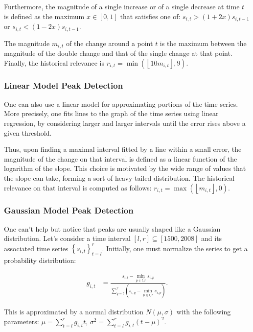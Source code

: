 Furthermore, the magnitude of a single increase or of a single decrease at time $t$ is defined as the maximum $x \in \left[ 0, 1 \right]$ that satisfies one of: $s_{i, t} > \left( 1 + 2x \right) s_{i, t - 1}$ or $s_{i, t} < \left( 1 - 2x \right) s_{i, t - 1}$.

The magnitude $m_{i, t}$ of the change around a point $t$ is the maximum between the magnitude of the double change and that of the single change at that point. Finally, the historical relevance is $r_{i, t} = \min \left( \left\lfloor 10 m_{i, t} \right\rfloor, 9 \right)$.

\subsubsection{Linear Model Peak Detection}

One can also use a linear model for approximating portions of the time series. More precisely, one fits lines to the graph of the time series using linear regression, by considering larger and larger intervals until the error rises above a given threshold.

Thus, upon finding a maximal interval fitted by a line within a small error, the magnitude of the change on that interval is defined as a linear function of the logarithm of the slope. This choice is motivated by the wide range of values that the slope can take, forming a sort of heavy-tailed distribution. The historical relevance on that interval is computed as follows: $r_{i, t} = \max \left( \left\lfloor m_{i, t} \right\rfloor, 0 \right)$.

\subsubsection{Gaussian Model Peak Detection}

One can't help but notice that peaks are usually shaped like a Gaussian distribution. Let's consider a time interval $\left[ l, r \right] \subseteq \left[ 1500, 2008 \right]$ and its associated time series $\left\{ s_{i, t} \right\}_{t=l}^{r}$. Initially, one must normalize the series to get a probability distribution:

\begin{align}
\label{eq:gaussian-normalization}
g_{i, t} &= \frac{s_{i, t} - \min_{p \in \overline{l, r}} s_{i, p}}{\sum_{q = l}^{r} \left( s_{i, q} - \min_{p \in \overline{l, r}} s_{i, p} \right)}.
\end{align}

This is approximated by a normal distribution $N \left( \mu, \sigma \right)$ with the following parameters: $\mu = \sum_{t=l}^{r} g_{i, t} t$, $\sigma^2 = \sum_{t=l}^{r} g_{i, t} \left( t - \mu \right)^2$.


